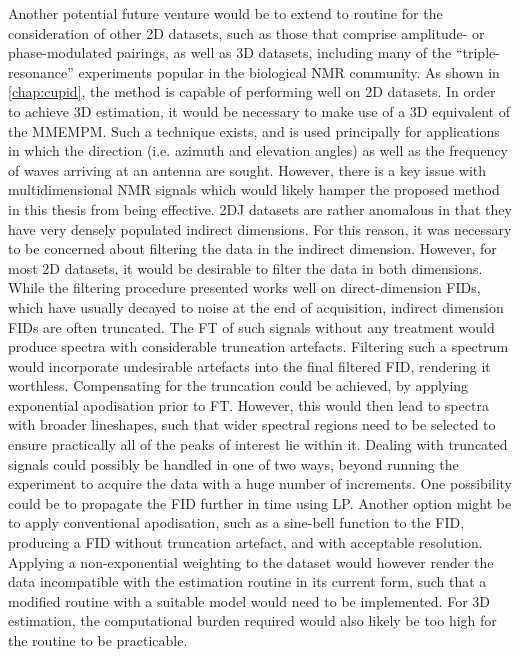 Another potential future venture would be to extend to routine for the
consideration of other \ac{2D} datasets, such as those that comprise
amplitude- or phase-modulated pairings, as well as \ac{3D} datasets,
including many of the ``triple-resonance'' experiments popular in the
biological \ac{NMR} community\cite[Section 7.4]{Cavanagh2007}. As shown in
\cref{chap:cupid}, the method is capable of performing well on \ac{2D}
datasets. In order to achieve \ac{3D} estimation, it would be necessary to
make use of a \ac{3D} equivalent of the \ac{MMEMPM}. Such a technique exists,
and is used principally for applications in which the direction (i.e. azimuth
and elevation angles) as well as the frequency of waves arriving at an antenna
are sought\cite{Yilmazer2006}. However, there is a key issue with
multidimensional \ac{NMR} signals which would likely hamper the proposed method
in this thesis from being effective. \ac{2DJ} datasets are rather anomalous in
that they have very densely populated indirect dimensions. For this reason, it
was necessary to be concerned about filtering the data in the indirect
dimension. However, for most \ac{2D} datasets, it would be desirable to filter
the data in both dimensions. While the filtering procedure presented works well
on direct-dimension \acp{FID}, which have usually decayed to noise at the end
of acquisition, indirect dimension \acp{FID} are often truncated. The \ac{FT}
of such signals without any treatment would produce spectra with considerable
truncation artefacts. Filtering such a spectrum would incorporate undesirable
artefacts into the final filtered \ac{FID}, rendering it worthless.
Compensating for the truncation could be achieved, by applying exponential
apodisation prior to \ac{FT}. However, this would then lead to spectra with
broader lineshapes, such that wider spectral regions need to be selected to
ensure practically all of the peaks of interest lie within it. Dealing with
truncated signals could possibly be handled in one of two ways, beyond running
the experiment to acquire the data with a huge number of increments. One
possibility could be to propagate the \ac{FID} further in time using \ac{LP}.
Another option might be to apply conventional apodisation, such as a sine-bell
function to the \ac{FID}, producing a \ac{FID} without truncation artefact, and
with acceptable resolution. Applying a non-exponential weighting to the dataset
would however render the data incompatible with the estimation routine in its
current form, such that a modified routine with a suitable model would need to
be implemented. For \ac{3D} estimation, the computational burden required would
also likely be too high for the routine to be practicable. 
